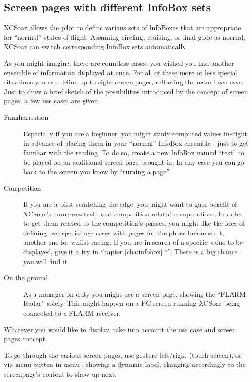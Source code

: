 \subsection*{Screen pages with different InfoBox sets}\label{sec:screenpages}

XCSoar allows the pilot to define various sets of InfoBoxes that are 
appropriate for ``normal'' states of flight.  Assuming circling,
cruising, or final glide as normal, XCSoar can switch corresponding InfoBox
sets automatically.

As you might imagine, there are countless cases, you wished you had another 
ensemble of information displayed at once.  For all of these more or less 
special situations you can define up to eight screen pages, reflecting the 
actual \emph{use case}. Just to draw a brief sketch of the possibilities 
introduced by the concept of screen pages, a few use cases are given. 
\label{par:use_case}
\begin{description}
\item[Familiarisation] Especially if you are a beginner, you might study 
computed values in-flight in advance of placing them in your ``normal'' InfoBox
ensemble - just to get familiar with the reading. To do so, create a new 
InfoBox named ``test'' to be placed on an additional screen page brought in. In
any case you can go back to the screen you know by ``turning a page''
\item[Competition] If you are a pilot scratching the edge, you might want to 
gain benefit of XCSoar's numerous task- and competition-related computations. 
In order to get them related to the competition's phases, you might like the 
idea of defining two special use cases with pages for the phase before start, 
another one for whilst racing.  If you are in search of a specific value to
be displayed, give it a try in chapter \ref{cha:infobox} ``''.
There is a big chance you will find it.
\item[On the ground] As a manager on duty you might use a screen page, showing 
the ``FLARM Radar'' solely.  This might happen on a PC screen running XCSoar
being connected to a FLARM receiver.
\end{description}

Whatever you would like to display, take into account the use case and screen 
pages concept.

To go through the various screen pages, use gesture left/right (touch-screen), or via menu button in menu , showing a dynamic label, changing accordingly to the screenpage's content to show up next:

